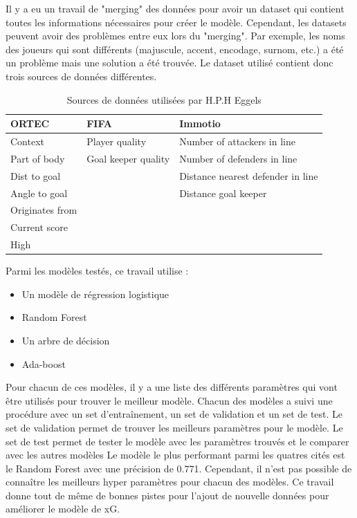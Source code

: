 \documentclass[12pt]{article}
\begin{document}
Il y a eu un travail de "merging" des données pour avoir un dataset qui contient toutes les informations nécessaires pour créer le modèle. 
Cependant, les datasets peuvent avoir des problèmes entre eux lors du "merging". 
Par exemple, les noms des joueurs qui sont différents (majuscule, accent, encodage, surnom, etc.) a été un problème mais une solution a été trouvée.
\newline
Le dataset utilisé contient donc trois sources de données différentes.
\begin{table}[htp]
    \centering
    \begin{tabular}{lll}
    \hline
    \textbf{ORTEC}  & \textbf{FIFA}       & \textbf{Immotio}                  \\ \hline
    Context         & Player quality      & Number of attackers in line       \\
    Part of body    & Goal keeper quality & Number of defenders in line       \\
    Dist to goal    &                     & Distance nearest defender in line \\
    Angle to goal   &                     & Distance goal keeper              \\
    Originates from &                     &                                   \\
    Current score   &                     &                                   \\
    High            &                     &                                   \\ \hline
    \end{tabular}
    \caption{Sources de données utilisées par H.P.H Eggels}
\end{table}
\newpage
Parmi les modèles testés, ce travail utilise :
\begin{itemize}
    \item Un modèle de régression logistique
    \item Random Forest
    \item Un arbre de décision
    \item Ada-boost
\end{itemize}
Pour chacun de ces modèles, il y a une liste des différents paramètres qui vont être utilisés pour trouver le meilleur modèle.
Chacun des modèles a suivi une procédure avec un set d'entraînement, un set de validation et un set de test.
Le set de validation permet de trouver les meilleurs paramètres pour le modèle.
Le set de test permet de tester le modèle avec les paramètres trouvés et le comparer avec les autres modèles
Le modèle le plus performant parmi les quatres cités est le Random Forest avec une précision de 0.771.
Cependant, il n'est pas possible de connaître les meilleurs hyper paramètres pour chacun des modèles.
Ce travail donne tout de même de bonnes pistes pour l'ajout de nouvelle données pour améliorer le modèle de xG.
\end{document}

